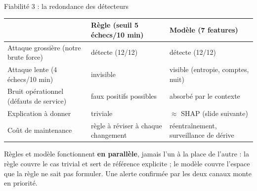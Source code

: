 \begin{frame}{Fiabilité 3 : la redondance des détecteurs}
\begin{center}
\footnotesize
\begin{tabular}{@{}p{3.6cm}p{3.4cm}p{3.4cm}@{}}
\toprule
 & \textbf{Règle (seuil 5 échecs/10 min)} & \textbf{Modèle (7 features)}\\
\midrule
Attaque grossière (notre brute force) & \ok{} détecte (12/12) & \ok{} détecte (12/12)\\
\addlinespace[1pt]
Attaque lente (4 échecs/10 min) & \nok{} invisible & \ok{} visible (entropie, comptes, nuit)\\
\addlinespace[1pt]
Bruit opérationnel (défauts de service) & \nok{} faux positifs possibles & \ok{} absorbé par le contexte\\
\addlinespace[1pt]
Explication à donner & \ok{} triviale & $\approx$ SHAP (slide suivante)\\
\addlinespace[1pt]
Coût de maintenance & règle à réviser à chaque changement & réentraînement, surveillance de dérive\\
\bottomrule
\end{tabular}
\end{center}
\vspace{1mm}
\begin{kbox}
Règles et modèle fonctionnent \textbf{en parallèle}, jamais l'un à la place
de l'autre : la règle couvre le cas trivial et sert de référence explicite ;
le modèle couvre l'espace que la règle ne sait pas formuler. Une alerte
confirmée par les deux canaux monte en priorité.
\end{kbox}
\end{frame}

